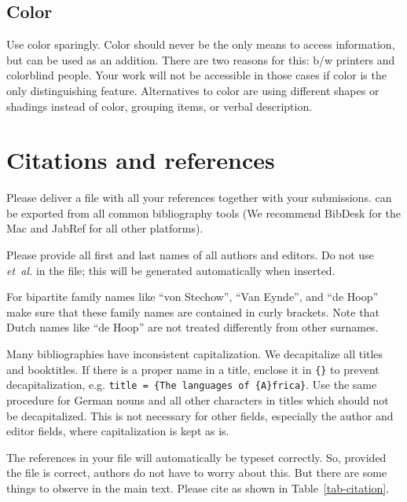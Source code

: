 {\subsection{Color}
Use color sparingly. Color should never be the only means to access information, but can be used as an addition. There are two reasons for this: b/w printers and colorblind people. Your work will not be accessible in those cases if color is the only distinguishing feature. Alternatives to color are using different shapes or shadings instead of color, grouping items, or verbal description. 




\section{Citations and references}
\label{sec-references-authors}

Please deliver a \bibtex file with all your references together with your submissions. 
\bibtex can be exported from all common bibliography tools (We recommend BibDesk for the Mac and JabRef for all other platforms). 

Please provide all first and last names of all authors and editors. Do not use {\em et~al.}  in the \bibtex file; this will be generated automatically when inserted.

For bipartite family names like ``von Stechow'', ``Van Eynde'', and ``de Hoop'' make sure that these
family names are contained in curly brackets.
 Note that Dutch names like ``de Hoop'' are not treated differently from other surnames.

Many bibliographies have inconsistent capitalization. We decapitalize all titles and booktitles. If there is a proper name in a title, enclose it in \verb+{}+ to prevent decapitalization, e.g. \verb+title = {The languages of {A}frica}+. Use the same procedure for German nouns and all other characters in titles which should not be decapitalized. This is not necessary for other fields, especially the author and editor fields, where capitalization is kept as is.

The references in your \bibtex file will automatically be typeset correctly. So, provided the
\bibtex file is correct, authors do not have to worry about this. But there are some things to
observe in the main text. Please cite as shown in Table~\ref{tab-citation}.

}
